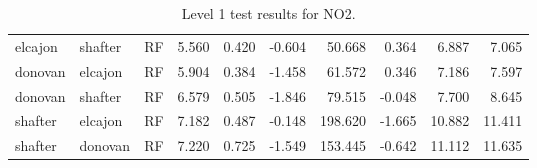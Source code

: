 \begin{table}[h]
\begin{tabular}{lllrrrrrrr}
elcajon & shafter & RF & 5.560 & 0.420 & -0.604 & 50.668 & 0.364 & 6.887 & 7.065\\
donovan & elcajon & RF & 5.904 & 0.384 & -1.458 & 61.572 & 0.346 & 7.186 & 7.597\\
donovan & shafter & RF & 6.579 & 0.505 & -1.846 & 79.515 & -0.048 & 7.700 & 8.645\\
shafter & elcajon & RF & 7.182 & 0.487 & -0.148 & 198.620 & -1.665 & 10.882 & 11.411\\
shafter & donovan & RF & 7.220 & 0.725 & -1.549 & 153.445 & -0.642 & 11.112 & 11.635\\
\bottomrule
\end{tabular}
\caption{Level 1 test results for NO2.}
\end{table}
